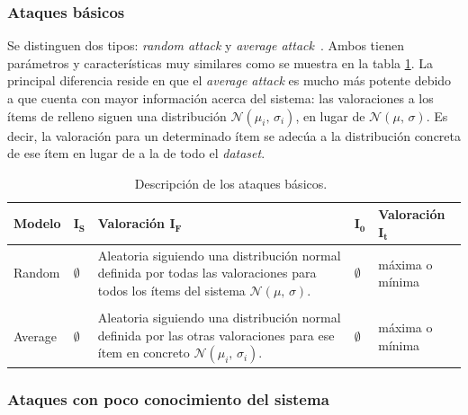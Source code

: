 \subsubsection{Ataques básicos}

Se distinguen dos tipos: \textit{random attack} y \textit{average attack}~\cite{mingdan2018ShillingAttacksAReview}. Ambos tienen parámetros y características muy similares como se muestra en la tabla \ref{tabla_descripcion_ataques_basicos}. La principal diferencia reside en que el \textit{average attack} es mucho más potente debido a que cuenta con mayor información acerca del sistema: las valoraciones a los ítems de relleno siguen una distribución $\mathcal{N}(\mu_i,\,\sigma_i)$, en lugar de $\mathcal{N}(\mu,\,\sigma)$. Es decir, la valoración para un determinado ítem se adecúa a la distribución concreta de ese ítem en lugar de a la de todo el \textit{dataset}.


\begin{table}
\small
\begin{centering}

		\begin{tabular}{@{}p{5em} p{2em} p{14em} p{2em} p{7em}@{}}
		\toprule
		\textbf{Modelo} & $\mathbf{I_S}$ & \textbf{Valoración} $\mathbf{I_F}$ & $\mathbf{I_0}$ & \textbf{Valoración} $\mathbf{I_t}$\\ 
		\midrule
	
		Random & $\emptyset$ & Aleatoria siguiendo una distribución normal definida por todas las valoraciones para todos los ítems del sistema $\mathcal{N}(\mu,\,\sigma)$. & $\emptyset$ & máxima o mínima \\\\
		
		Average & $\emptyset$ & Aleatoria siguiendo una distribución normal definida por las otras valoraciones para ese ítem en concreto $\mathcal{N}(\mu_i,\,\sigma_i)$. & $\emptyset$ & máxima o mínima\\
		\bottomrule
		\end{tabular}
	
\end{centering}
\caption{Descripción de los ataques básicos.~\cite{zhou2021SemisupervisedRecommendationAttack}}
\label{tabla_descripcion_ataques_basicos}	
\end{table}


\subsubsection{Ataques con poco conocimiento del sistema}

